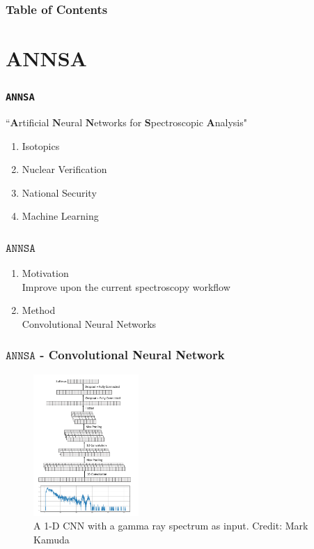 \graphicspath{{./images/}}

	\begin{frame}
		\frametitle{Table of Contents}
		\tableofcontents
	\end{frame}

	\section{ANNSA}

	\begin{frame}
		\frametitle{\texttt{ANNSA}}
		``$\textbf{A}$rtificial $\textbf{N}$eural $\textbf{N}$etworks for $\textbf{S}$pectroscopic $\textbf{A}$nalysis"\\
		\begin{enumerate}
			\item Isotopics
			\item Nuclear Verification
			\item National Security 
			\item Machine Learning
		\end{enumerate}
	\end{frame}	
	\begin{frame}
		\frametitle{$\texttt{ANNSA}$}
		\begin{enumerate}
			\item Motivation\\
			Improve upon the current spectroscopy workflow
			\item Method\\
			Convolutional Neural Networks
		\end{enumerate} 
	\end{frame}
	\begin{frame}
		\frametitle{$\texttt{ANNSA}$ - Convolutional Neural Network}
		\begin{figure}
			\includegraphics[width=4cm]{cnn-figure.png}
			\caption{A 1-D CNN with a gamma ray spectrum as input. Credit: Mark Kamuda}
		\end{figure}
	\end{frame}

